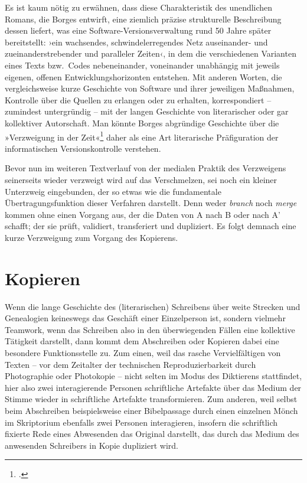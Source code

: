 \documentclass[a4paper,11pt]{article}
\newcommand{\anf}[1]{»#1«}
\newcommand{\inanf}[1]{›#1‹}
\begin{document}
Es ist kaum nötig zu erwähnen, dass diese Charakteristik des unendlichen Romans, die Borges entwirft, eine ziemlich präzise strukturelle Beschreibung dessen liefert, was eine Software-Versionsverwaltung rund 50 Jahre später bereitstellt: \inanf{ein wachsendes, schwindelerregendes Netz auseinander- und zueinanderstrebender und paralleler Zeiten}, in dem die verschiedenen Varianten eines Texts bzw.\  Codes nebeneinander, voneinander unabhängig mit jeweils eigenen, offenen Entwicklungshorizonten entstehen. Mit anderen Worten, die vergleichsweise kurze Geschichte von Software und ihrer jeweiligen Maßnahmen, Kontrolle über die Quellen zu erlangen oder zu erhalten, korrespondiert – zumindest untergründig – mit der langen Geschichte von literarischer oder gar kollektiver Autorschaft. Man könnte Borges abgründige Geschichte über die \anf{Verzweigung in der Zeit}\footcite[169]{borges:1941} daher als eine Art literarische Präfiguration der informatischen Versionskontrolle verstehen. 

Bevor nun im weiteren Textverlauf von der medialen Praktik des Verzweigens seinerseits wieder verzweigt wird auf das Verschmelzen, sei noch ein kleiner Unterzweig eingebunden, der so etwas wie die fundamentale Übertragungsfunktion dieser Verfahren darstellt. Denn weder \emph{branch} noch \emph{merge} kommen ohne einen Vorgang aus, der die Daten von A nach B oder nach A' schafft; der sie prüft, validiert, transferiert und dupliziert. Es folgt demnach eine kurze Verzweigung zum Vorgang des Kopierens.

\section{Kopieren}

Wenn die lange Geschichte des (literarischen) Schreibens über weite Strecken und Genealogien keineswegs das Geschäft einer Einzelperson ist, sondern vielmehr Teamwork, wenn das Schreiben also in den überwiegenden Fällen eine kollektive Tätigkeit darstellt, dann kommt dem Abschreiben oder Kopieren dabei eine besondere Funktionsstelle zu. Zum einen, weil das rasche Vervielfältigen von Texten – vor dem Zeitalter der technischen Reproduzierbarkeit durch Photographie oder Photokopie – nicht selten im Modus des Diktierens stattfindet, hier also zwei interagierende Personen schriftliche Artefakte über das Medium der Stimme wieder in schriftliche Artefakte transformieren. Zum anderen, weil selbst beim Abschreiben beispielsweise einer Bibelpassage durch einen einzelnen Mönch im Skriptorium ebenfalls zwei Personen interagieren, insofern die schriftlich fixierte Rede eines Abwesenden das Original darstellt, das durch das Medium des anwesenden Schreibers in Kopie dupliziert wird. 
\end{document}
